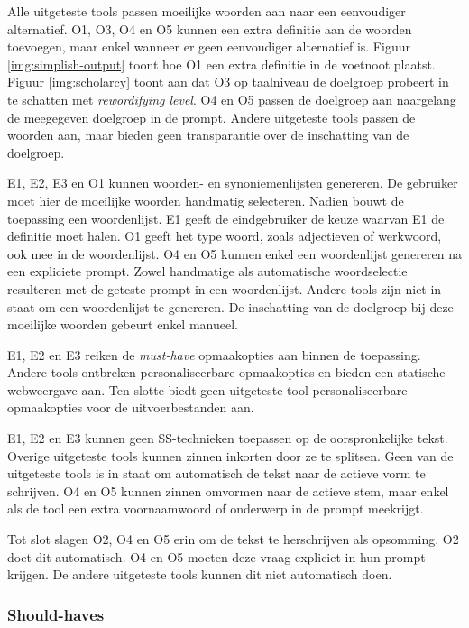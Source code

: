 Alle uitgeteste tools passen moeilijke woorden aan naar een eenvoudiger alternatief. O1, O3, O4 en O5 kunnen een extra definitie aan de woorden toevoegen, maar enkel wanneer er geen eenvoudiger alternatief is. Figuur \ref{img:simplish-output} toont hoe O1 een extra definitie in de voetnoot plaatst. Figuur \ref{img:scholarcy} toont aan dat O3 op taalniveau de doelgroep probeert in te schatten met \textit{rewordifying level}. O4 en O5 passen de doelgroep aan naargelang de meegegeven doelgroep in de prompt. Andere uitgeteste tools passen de woorden aan, maar bieden geen transparantie over de inschatting van de doelgroep.

\medspace

E1, E2, E3 en O1 kunnen woorden- en synoniemenlijsten genereren. De gebruiker moet hier de moeilijke woorden handmatig selecteren. Nadien bouwt de toepassing een woordenlijst. E1 geeft de eindgebruiker de keuze waarvan E1 de definitie moet halen. O1 geeft het type woord, zoals adjectieven of werkwoord, ook mee in de woordenlijst. O4 en O5 kunnen enkel een woordenlijst genereren na een expliciete prompt. Zowel handmatige als automatische woordselectie resulteren met de geteste prompt in een woordenlijst. Andere tools zijn niet in staat om een woordenlijst te genereren. De inschatting van de doelgroep bij deze moeilijke woorden gebeurt enkel manueel.

\medspace

E1, E2 en E3 reiken de \textit{must-have} opmaakopties aan binnen de toepassing. Andere tools ontbreken personaliseerbare opmaakopties en bieden een statische webweergave aan. Ten slotte biedt geen uitgeteste tool personaliseerbare opmaakopties voor de uitvoerbestanden aan. 

\medspace

E1, E2 en E3 kunnen geen SS-technieken toepassen op de oorspronkelijke tekst. Overige uitgeteste tools kunnen zinnen inkorten door ze te splitsen. Geen van de uitgeteste tools is in staat om automatisch de tekst naar de actieve vorm te schrijven. O4 en O5 kunnen zinnen omvormen naar de actieve stem, maar enkel als de tool een extra voornaamwoord of onderwerp in de prompt meekrijgt.

\medspace

Tot slot slagen O2, O4 en O5 erin om de tekst te herschrijven als opsomming. O2 doet dit automatisch. O4 en O5 moeten deze vraag expliciet in hun prompt krijgen. De andere uitgeteste tools kunnen dit niet automatisch doen.

\subsubsection{Should-haves}

